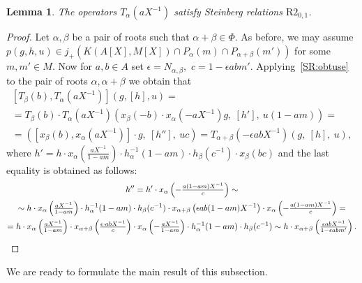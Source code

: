 \documentclass[oneside, 8pt]{amsart}
\newtheorem{lemma}{Lemma}
\theoremstyle{remark}
\theoremstyle{definition}
\numberwithin{lemma}{section}
\numberwithin{prop}{section}
\numberwithin{corollary}{section}
\numberwithin{equation}{section}
\begin{document}
\begin{lemma} \label{R2_0_1} The operators $T_\alpha(aX^{-1})$ satisfy Steinberg relations $\mathrm{R2}_{0,1}$. \end{lemma}
\begin{proof} 
Let $\alpha, \beta$ be a pair of roots such that $\alpha + \beta \in \Phi$.
As before, we may assume $p(g, h, u) \in j_+(K(A[X], M[X]) \cap P_\alpha(m) \cap P_{\alpha + \beta}(m'))$ for some $m, m' \in M$.
Now for $a, b \in A$ set $\epsilon = N_{\alpha, \beta},$ $c = 1 - \epsilon abm'$.
Applying~\cref{SR:obtuse} to the pair of roots $\alpha, \alpha+\beta$ we obtain that 
\begin{multline} \nonumber
[T_\beta(b), T_\alpha(aX^{-1})] \left(g, [h], u \right) = \\
 = T_\beta(b) \cdot T_\alpha(aX^{-1}) \left(x_\beta(-b) \cdot x_\alpha (-a X^{-1}) g,\ [h'],\ u (1 - am) \right) = \\
 = \left([x_\beta(b), x_\alpha(aX^{-1})]\cdot g,\ [h''],\ u c\right) = T_{\alpha+\beta}(-\epsilon abX^{-1})(g,\ [h],\ u),\end{multline} 
 where $h' = h\cdot x_\alpha\left(\tfrac{a X^{-1}}{1-am}\right) \cdot h_{\alpha}^{-1}(1-am)\cdot h_{\beta}(c^{-1}) \cdot x_{\beta}(bc)$  
  and the last equality is obtained as follows:
 \begin{multline} \nonumber
 h'' = h' \cdot x_\alpha\left(-\tfrac{a(1 - am)X^{-1}}{c}\right) \sim \\ \sim  h\cdot x_\alpha\left(\tfrac{a X^{-1}}{1-am}\right) \cdot h_{\alpha}^{-1}(1-am)\cdot h_{\beta}(c^{-1})\cdot x_{\alpha + \beta}\left(\epsilon ab(1-am)X^{-1}\right)\cdot x_\alpha\left(-\tfrac{a(1 - am)X^{-1}}{c}\right) = \\
 = h\cdot x_\alpha\left(\tfrac{a X^{-1}}{1-am}\right) \cdot x_{\alpha + \beta}\left(\tfrac{\epsilon \cdot abX^{-1}}{c}\right)\cdot x_\alpha\left(-\tfrac{aX^{-1}}{1 - am}\right) \cdot h_{\alpha}^{-1}(1-am)\cdot h_{\beta}(c^{-1}) \sim
 h\cdot x_{\alpha + \beta}\left(\tfrac{\epsilon   abX^{-1}}{1 - \epsilon a b m'}\right). \qedhere
\end{multline}
\end{proof}

We are ready to formulate the main result of this subsection.
\end{document}
